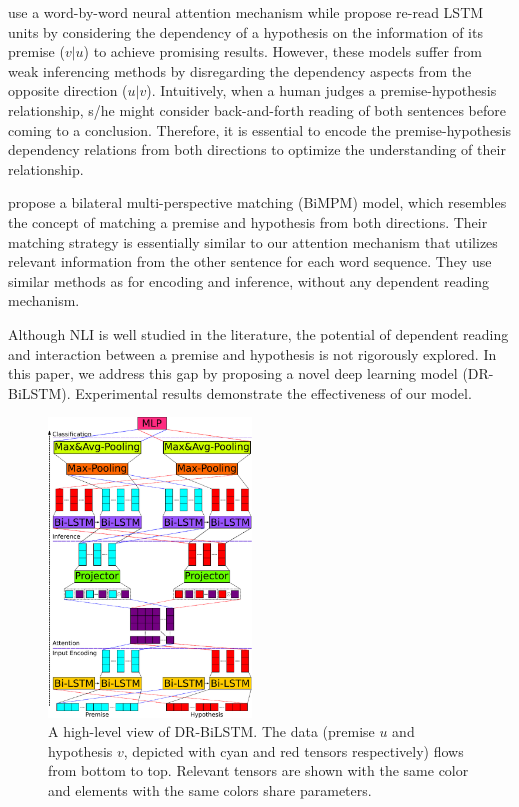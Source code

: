 \documentclass[11pt,a4paper]{article}
\begin{document}
	\citet{Rocktaschel2015} use a word-by-word neural attention mechanism while \citet{re-read} propose re-read LSTM units by considering the dependency of a hypothesis on the information of its premise ($v|u$) to achieve promising results. However, these models suffer from weak inferencing methods by disregarding the dependency aspects from the opposite direction ($u|v$). Intuitively, when a human judges a premise-hypothesis relationship, s/he might consider back-and-forth reading of both sentences before coming to a conclusion. Therefore, it is essential to encode the premise-hypothesis dependency relations from both directions to optimize the understanding of their relationship.    
	
	\citet{ibm2017} propose a bilateral multi-perspective matching (BiMPM) model, which resembles the concept of matching a premise and hypothesis from both directions. Their matching strategy is essentially similar to our attention mechanism that utilizes relevant information from the other sentence for each word sequence. They use similar methods as \citet{him2017} for encoding and inference, without any dependent reading mechanism. 
	
	Although NLI is well studied in the literature, the potential of dependent reading and interaction between a premise and hypothesis is not rigorously explored. In this paper, we address this gap by proposing a novel deep learning model (DR-BiLSTM). Experimental results demonstrate the effectiveness of our model.
	
	\begin{figure}[ht]
		\centering
		\includegraphics[width=0.48\textwidth ]{SNLI_paper_light.pdf}
		\caption{A high-level view of DR-BiLSTM. The data (premise $u$ and hypothesis $v$, depicted with cyan and red tensors respectively) flows from bottom to top. Relevant tensors are shown with the same color and elements with the same colors share parameters. \label{fig:model}}
	\end{figure}
	
\end{document}
